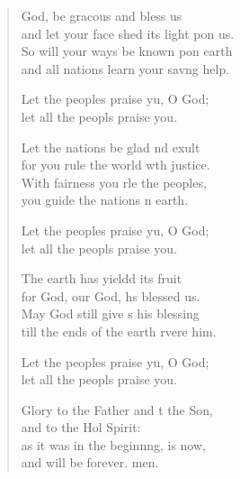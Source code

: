 \begin{verse}
  \begin{patverse}
 God, be grac\pointup{\i}ous and bless us\Med\\
and let your face shed its light pon us.\\
So will your ways be known pon earth\Med\\
and all nations learn your sav\pointup{\i}ng help.

Let the peoples praise yu, O God;\Med\\
let all the peopls praise you.

Let the nations be glad nd exult\Med\\
for you rule the world w\pointup{\i}th justice.\\
With fairness you rle the peoples,\Med\\
you guide the nations n earth.

Let the peoples praise yu, O God;\Med\\
let all the peopls praise you.

The earth has yieldd its fruit\Med\\
for God, our God, hs blessed us.\\
May God still give s his blessing\Med\\
till the ends of the earth rvere him.

Let the peoples praise yu, O God;\Med\\
let all the peopls praise you.

Glory to the Father and t the Son,\Med\\
and to the Hol Spirit:\\
as it was in the beginn\pointup{\i}ng, is now,\Med\\
and will be forever. men.
  \end{patverse}
\end{verse}
